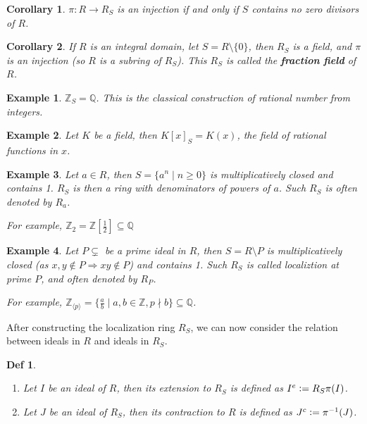\documentclass[a4paper]{article}
\newcommand*{\defeq}{\vcentcolon=}
\newcommand*{\Zb}{\mathbb{Z}}
\newcommand*{\Qb}{\mathbb{Q}}
\theoremstyle{mystyle}
\newtheorem{definition}{Def}
\newtheorem{example}{Example}
\newtheorem{coro}{Corollary}
\begin{document}
\begin{coro}
  $\pi : R \to R_S$ is an injection if and only if $S$ contains no zero divisors
  of $R$.
\end{coro}

\begin{coro}
  If $R$ is an integral domain, let $S = R \setminus \{0\}$, then 
  $R_S$ is a field, and $\pi$ is an injection (so $R$ is a subring of $R_S$).
  This $R_S$ is called the {\bf fraction field} of $R$.
\end{coro}

\begin{example}
  $\Zb_S = \Qb$. This is the classical construction of rational number from 
  integers.
\end{example}

\begin{example}
  Let $K$ be a field, then $K[x]_S = K(x)$, the field of rational functions in $x$.
\end{example}

\begin{example}
  Let $a \in R$, then $S = \{a^n \mid n \geq 0\}$ is multiplicatively closed and
  contains 1. $R_S$ is then a ring with denominators of powers of $a$.
  Such $R_S$ is often denoted by $R_a$.

  For example, $\Zb_{2} = \Zb[\frac{1}{2}] \subseteq \Qb$
\end{example}

\begin{example}
  Let $P \subsetneq$ be a prime ideal in $R$, then $S = R \setminus P$ is multiplicatively closed
  (as $x, y \notin P \Rightarrow xy \notin P$) and contains 1.
  Such $R_S$ is called {\it localiztion at prime $P$}, and often denoted by $R_P$.

  For example, $\Zb_{\langle p \rangle} = 
  \{ \frac{a}{b} \mid a, b \in \Zb, p \nmid b\} \subseteq \Qb$.
\end{example}

After constructing the localization ring $R_S$, we can now consider the relation 
between ideals in $R$ and ideals in $R_S$.

\begin{definition}
  $\ $
  \begin{enumerate}
    \item Let $I$ be an ideal of $R$, then its {\it extension} to $R_S$ is defined as
      $I^e \defeq R_S\pi(I)$.
    \item Let $J$ be an ideal of $R_S$, then its {\it contraction} to $R$ is defined as
      $J^c \defeq \pi^{-1}(J)$.
  \end{enumerate}
\end{definition}
\end{document}
